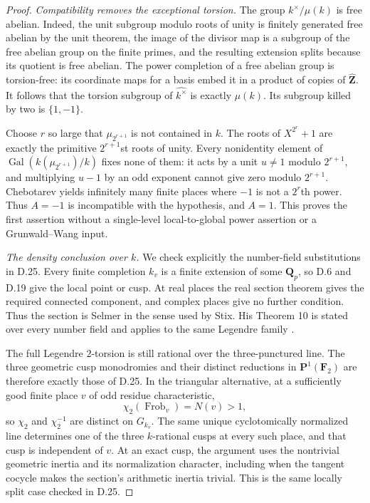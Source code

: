 \begin{proof}
\emph{Compatibility removes the exceptional torsion.}
The group $k^\times/\mu(k)$ is free abelian. Indeed, the
unit subgroup modulo roots of unity is finitely generated
free abelian by the unit theorem, the image of the divisor
map is a subgroup of the free abelian group on the finite
primes, and the resulting extension splits because its
quotient is free abelian. The power completion of a free
abelian group is torsion-free: its coordinate maps for a
basis embed it in a product of copies of
$\widehat{\mathbf Z}$. It follows that the torsion subgroup
of $\widehat{k^\times}$ is exactly $\mu(k)$. Its subgroup
killed by two is $\{1,-1\}$.

Choose $r$ so large that $\mu_{2^{r+1}}$ is not contained
in $k$. The roots of $X^{2^r}+1$ are exactly the primitive
$2^{r+1}$st roots of unity. Every nonidentity element of
$\operatorname{Gal}(k(\mu_{2^{r+1}})/k)$ fixes none of them:
it acts by a unit $u\ne1$ modulo $2^{r+1}$, and multiplying
$u-1$ by an odd exponent cannot give zero modulo $2^{r+1}$.
Chebotarev yields infinitely many finite places where $-1$
is not a $2^r$th power. Thus $A=-1$ is incompatible with
the hypothesis, and $A=1$.
This proves the first assertion without a single-level
local-to-global power assertion or a Grunwald--Wang input.

\emph{The density conclusion over $k$.}
We check explicitly the number-field substitutions in D.25.
Every finite completion $k_v$ is a finite extension of some
$\mathbf Q_p$, so D.6 and D.19 give the local point or cusp.
At real places the real section theorem gives the required
connected component, and complex places give no further
condition. Thus the section is Selmer in the sense used by
Stix. His Theorem 10 is stated over every number field and
applies to the same Legendre family
\cite[Theorem 10]{D_Stix2015}.

The full Legendre $2$-torsion is still rational over the
three-punctured line. The three geometric cusp monodromies
and their distinct reductions in
$\mathbf P^1(\mathbf F_2)$ are therefore exactly those of
D.25. In the triangular alternative, at a sufficiently
good finite place $v$ of odd residue characteristic,
\[
 \chi_2(\operatorname{Frob}_v)=N(v)>1,
\]
so $\chi_2$ and $\chi_2^{-1}$ are distinct on $G_{k_v}$.
The same unique cyclotomically normalized line determines
one of the three $k$-rational cusps at every such place,
and that cusp is independent of $v$. At an exact cusp,
the argument uses the nontrivial geometric inertia and its
normalization character, including when the tangent cocycle
makes the section's arithmetic inertia trivial. This is
the same locally split case checked in D.25.


\end{proof}
